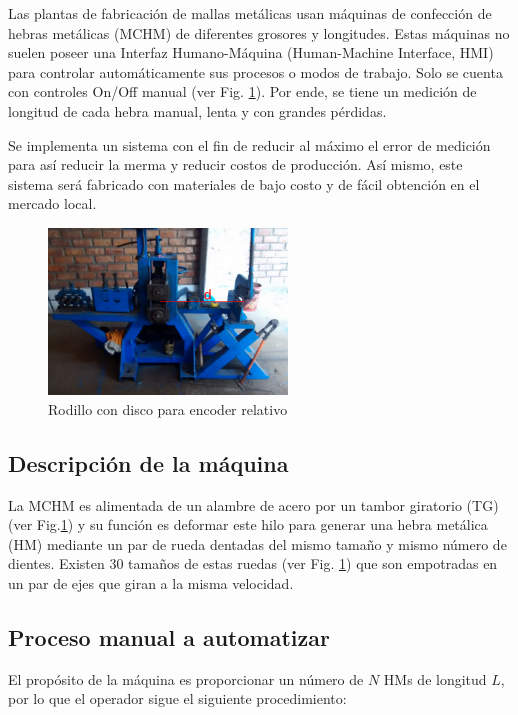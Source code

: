 \documentclass[main_conf.tex]{subfiles}
\begin{document}
Las plantas de fabricación de mallas metálicas usan máquinas de
confección de hebras metálicas (MCHM) de diferentes grosores y
longitudes. Estas máquinas no suelen poseer una Interfaz
Humano-Máquina (Human-Machine Interface, HMI) para controlar
automáticamente sus procesos o modos de trabajo. Solo se 
cuenta con controles On/Off manual (ver Fig.
\ref{maquina_a_automatizar}). Por ende, se tiene un medición de
longitud de cada hebra manual, lenta y con grandes pérdidas.

Se implementa un sistema con el fin de reducir al máximo el
error de medición para así reducir la merma y reducir costos de
producción. Así mismo, este sistema será fabricado con materiales
de bajo costo y de fácil obtención en el mercado local.

\begin{figure}[h]
  \centering
  \includegraphics[width=2.5in]{../img/distancia_inicial.png}
  \caption{Rodillo con disco para encoder relativo}
  \label{maquina_a_automatizar}
\end{figure}

\subsection{Descripción de la máquina}
La MCHM es alimentada de un alambre de acero por un tambor
giratorio (TG) (ver Fig.\ref{maquina_a_automatizar}) y su función es
deformar este hilo para generar una hebra metálica (HM) mediante un
par de rueda dentadas del mismo tamaño y mismo número de dientes.
Existen 30 tamaños de estas ruedas (ver Fig.
\ref{maquina_a_automatizar}) que son empotradas en un par
de ejes que giran a la misma velocidad.

\subsection{Proceso manual a automatizar}
\label{sec:intro:proceso_manual}
El propósito de la máquina es proporcionar un número de $N$ HMs
de longitud $L$, por lo que el operador sigue el siguiente
procedimiento:
\end{document}
